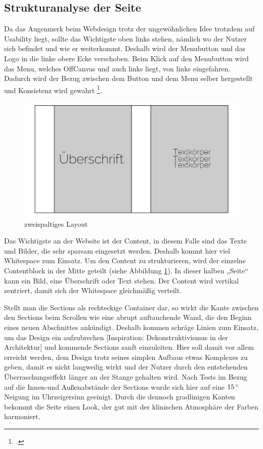 	\subsection{Strukturanalyse der Seite}

Da das Augenmerk beim Webdesign trotz der ungewöhnlichen Idee trotzdem auf Usability liegt, sollte das Wichtigste oben links stehen, nämlich wo der Nutzer sich befindet und wie er weiterkommt. Deshalb wird der Menubutton und das Logo in die linke obere Ecke verschoben. Beim Klick auf den Menubutton wird das Menu, welches OffCanvas und auch links liegt, von links eingefahren. Dadurch wird der Bezug zwischen dem Button und dem Menu selber hergestellt und Konsistenz wird gewahrt \footcite[vgl.][]{MaterialD:menu}.
 \begin{figure} [htp]
\includegraphics[width=\textwidth]{./img/inno_struct1.png}
\caption{zweispaltiges Layout}
\label{inno_Struct1}
\end{figure}
Das Wichtigste an der Website ist der Content, in diesem Falle sind das Texte und Bilder, die sehr sparsam eingesetzt werden. Deshalb kommt hier viel Whitespace zum Einsatz. Um den Content zu strukturieren, wird der einzelne Contentblock in der Mitte geteilt (siehe Abbildung \ref{inno_Struct1}). In dieser halben „Seite“ kann ein Bild, eine Überschrift oder Text stehen. Der Content wird vertikal zentriert, damit sich der Whitespace gleichmäßig verteilt.

Stellt man die Sections als rechteckige Container dar, so wirkt die Kante zwischen den Sections beim Scrollen wie eine abrupt auftauchende Wand, die den Beginn eines neuen Abschnittes ankündigt. Deshalb kommen schräge Linien zum Einsatz, um das Design ein aufzubrechen [Inspiration: Dekonstruktivismus in der Architektur] und kommende Sections sanft einzuleiten. Hier soll damit vor allem erreicht werden, dem Design trotz seines simplen Aufbaus etwas Komplexes zu geben, damit es nicht langweilig wirkt und der Nutzer durch den entstehenden Überraschungseffekt länger an der Stange gehalten wird. Nach Tests im Bezug auf die Innen-und Außenabstände der Sections wurde sich hier auf eine $15\,^{\circ}{\rm}$ Neigung im Uhrzeigersinn geeinigt. Durch die dennoch gradlinigen Kanten bekommt die Seite einen Look, der gut mit der klinischen Atmosphäre der Farben harmoniert. 



